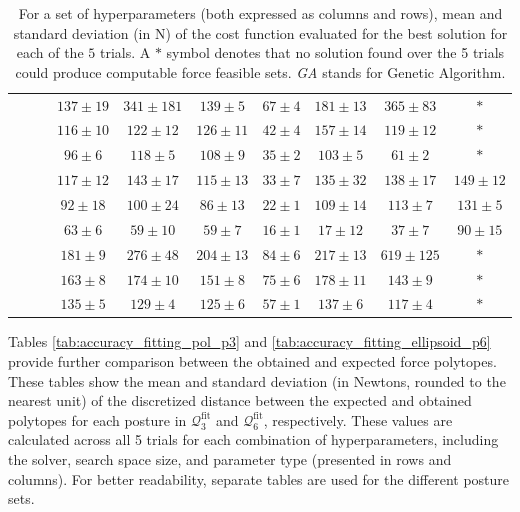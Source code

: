 \begin{table}[!ht]
\begin{tabular}{|c|c|c|c|c|c|c|c|c|c|}
    &  
      &  &  $137\pm 19$ & $341\pm 181$ & $139\pm 5$ & $67\pm 4$ & $181\pm 13$ & $365\pm 83$ & $*$ \\  
    & &  & $116\pm 10$ & $122\pm 12$ & $126\pm 11$ & $42\pm 4$ & $157\pm 14$ & $119\pm 12$ & $*$ \\  
    & &  &  $96\pm 6$ & $118\pm 5$ & $108\pm 9$ & $35\pm 2$ & $103\pm 5$ & $61\pm 2$ & $*$ \\ 
    \hline
    \hline
     &  
      &  &  $117\pm 12$ & $143\pm 17$ & $115\pm 13$ & $33\pm 7$ & $135\pm 32$ & $138\pm 17$ & $149\pm 12$ \\  
    & &  & $92\pm 18$ & $100\pm 24$ & $86\pm 13$ & $22\pm 1$ & $109\pm 14$ & $113\pm 7$ & $131\pm 5$ \\  
    & &  &  $63\pm 6$ & $59\pm 10$ & $59\pm 7$ & $16\pm 1$ & $17\pm 12$ & $37\pm 7$ & $90\pm 15$ \\ 

    &  
      &  &  $181\pm 9$ & $276\pm 48$ & $204\pm 13$ & $84\pm 6$ & $217\pm 13$ & $619\pm 125$ & $*$ \\  
    & &  & $163\pm 8$ & $174\pm 10$ & $151\pm 8$ & $75\pm 6$ & $178\pm 11$ & $143\pm 9$ & $*$ \\  
    & &  &  $135\pm 5$ & $129\pm 4$ & $125\pm 6$ & $57\pm 1$ & $137\pm 6$ & $117\pm 4$ & $*$ \\ 
    \hline
    
    \end{tabular}
    \caption{For a set of hyperparameters (both expressed as columns and rows), mean and standard deviation (in N) of the cost function evaluated for the best solution for each of the $5$ trials. A $*$ symbol denotes that no solution found over the 5 trials could produce computable force feasible sets. \emph{GA} stands for Genetic Algorithm.}
    \label{tab:accuracy_fitting_pol_MEAN_COST_FCT_OVER_ALL_SOLUTIONS}
\end{table}
\egroup

Tables \ref{tab:accuracy_fitting_pol_p3} and \ref{tab:accuracy_fitting_ellipsoid_p6} provide further comparison between the obtained and expected force polytopes. These tables show the mean and standard deviation (in Newtons, rounded to the nearest unit) of the discretized distance between the expected and obtained polytopes for each posture in $\mathcal{Q}_3^{\text{fit}}$ and $\mathcal{Q}_6^{\text{fit}}$, respectively. These values are calculated across all 5 trials for each combination of hyperparameters, including the solver, search space size, and parameter type (presented in rows and columns). For better readability, separate tables are used for the different posture sets.

